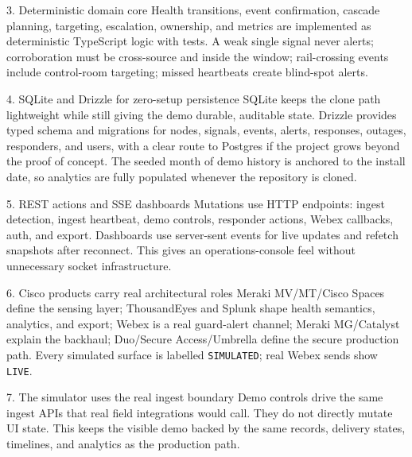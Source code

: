 \documentclass[10pt,a4paper]{article}
\begin{document}
\begin{decisionbox}{3. Deterministic domain core}
Health transitions, event confirmation, cascade planning, targeting, escalation, ownership, and metrics are implemented as deterministic TypeScript logic with tests. A weak single signal never alerts; corroboration must be cross-source and inside the window; rail-crossing events include control-room targeting; missed heartbeats create blind-spot alerts.
\end{decisionbox}

\begin{decisionbox}{4. SQLite and Drizzle for zero-setup persistence}
SQLite keeps the clone path lightweight while still giving the demo durable, auditable state. Drizzle provides typed schema and migrations for nodes, signals, events, alerts, responses, outages, responders, and users, with a clear route to Postgres if the project grows beyond the proof of concept. The seeded month of demo history is anchored to the install date, so analytics are fully populated whenever the repository is cloned.
\end{decisionbox}

\begin{decisionbox}{5. REST actions and SSE dashboards}
Mutations use HTTP endpoints: ingest detection, ingest heartbeat, demo controls, responder actions, Webex callbacks, auth, and export. Dashboards use server-sent events for live updates and refetch snapshots after reconnect. This gives an operations-console feel without unnecessary socket infrastructure.
\end{decisionbox}

\begin{decisionbox}{6. Cisco products carry real architectural roles}
Meraki MV/MT/Cisco Spaces define the sensing layer; ThousandEyes and Splunk shape health semantics, analytics, and export; Webex is a real guard-alert channel; Meraki MG/Catalyst explain the backhaul; Duo/Secure Access/Umbrella define the secure production path. Every simulated surface is labelled \texttt{SIMULATED}; real Webex sends show \texttt{LIVE}.
\end{decisionbox}

\begin{decisionbox}{7. The simulator uses the real ingest boundary}
Demo controls drive the same ingest APIs that real field integrations would call. They do not directly mutate UI state. This keeps the visible demo backed by the same records, delivery states, timelines, and analytics as the production path.
\end{decisionbox}
\end{document}
